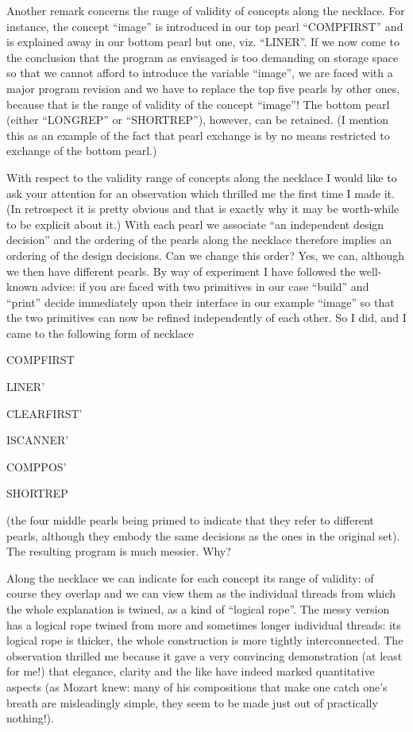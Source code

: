 Another remark concerns the range of validity of concepts along the necklace. For instance, the concept ``image'' is introduced in our top pearl ``COMPFIRST'' and is explained away in our bottom pearl but one, viz. ``LINER''. If we now come to the conclusion that the program as envisaged is too demanding on storage space so that we cannot afford to introduce the variable ``image'', we are faced with a major program revision and we have to replace the top five pearls by other ones, because that is the range of validity of the concept ``image''! The bottom pearl (either ``LONGREP'' or ``SHORTREP''), however, can be retained. (I mention this as an example of the fact that pearl exchange is by no means restricted to exchange of the bottom pearl.)

With respect to the validity range of concepts along the necklace I would like to ask your attention for an observation which thrilled me the first time I made it. (In retrospect it is pretty obvious and that is exactly why it may be worth-while to be explicit about it.) With each pearl we associate ``an independent design decision'' and the ordering of the pearls along the necklace therefore implies an ordering of the design decisions. Can we change this order? Yes, we can, although we then have different pearls. By way of experiment I have followed the well-known advice: if you are faced with two primitives \textemdash{}  in our case ``build'' and ``print'' \textemdash{}  decide immediately upon their interface \textemdash{}  in our example ``image'' \textemdash{}  so that the two primitives can now be refined independently of each other. So I did, and I came to the following form of necklace

COMPFIRST

LINER'

CLEARFIRST'

ISCANNER'

COMPPOS'

SHORTREP

\noindent
(the four middle pearls being primed to indicate that they refer to different pearls, although they embody the same decisions as the ones in the original set). The resulting program is much messier. Why?

Along the necklace we can indicate for each concept its range of validity: of course they overlap and we can view them as the individual threads from which the whole explanation is twined, as a kind of ``logical rope''. The messy version has a logical rope twined from more and sometimes longer individual threads: its logical rope is thicker, the whole construction is more tightly interconnected. The observation thrilled me because it gave a very convincing demonstration (at least for me!) that elegance, clarity and the like have indeed marked quantitative aspects (as Mozart knew: many of his compositions that make one catch one's breath are misleadingly simple, they seem to be made just out of practically nothing!).

